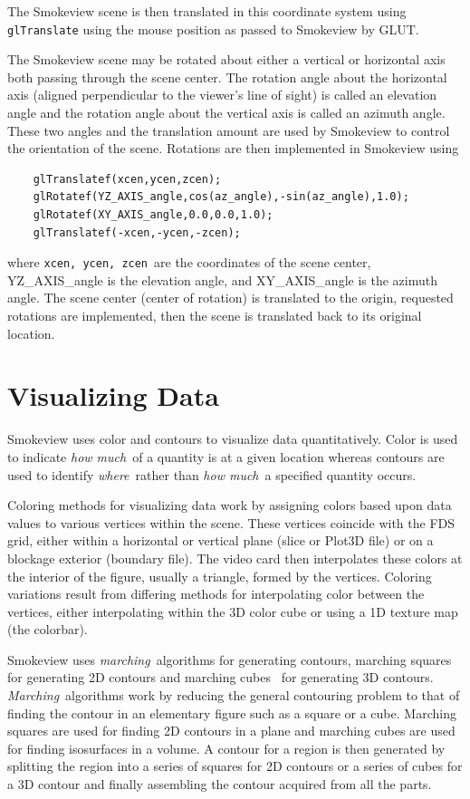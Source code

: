 \documentclass[11pt,twoside]{book}
\begin{document}
The Smokeview scene is then translated in this coordinate system
using {\tt glTranslate} using the mouse position as passed to
Smokeview by GLUT.

The Smokeview scene may be rotated about either a vertical or
horizontal axis both passing through the scene center.  The
rotation angle about the horizontal axis (aligned perpendicular to
the viewer's line of sight) is called an elevation angle and the
rotation angle about the vertical axis is called an azimuth angle.
These two angles and the translation amount are used by Smokeview
to control the orientation of the scene.   Rotations are then
implemented in Smokeview using
\begin{lstlisting}
    glTranslatef(xcen,ycen,zcen);
    glRotatef(YZ_AXIS_angle,cos(az_angle),-sin(az_angle),1.0);
    glRotatef(XY_AXIS_angle,0.0,0.0,1.0);
    glTranslatef(-xcen,-ycen,-zcen);
\end{lstlisting}
where {\tt xcen, ycen, zcen}\ are the coordinates of the scene
center, YZ\_AXIS\_angle is the elevation angle, and
XY\_AXIS\_angle is the azimuth angle.  The scene center (center of
rotation) is translated to the origin, requested rotations are
implemented, then the scene is translated back to its original
location.

%
%

\chapter{Visualizing Data}
Smokeview uses color and contours to visualize data
quantitatively. Color is used to indicate {\em how much}\ of a
quantity is at a given location whereas contours are used to
identify {\em where}\ rather than {\em how much}\ a specified
quantity occurs.

Coloring methods for visualizing data work by assigning colors
based upon data values to various vertices within the scene. These
vertices coincide with the FDS grid, either within a horizontal or
vertical plane (slice or Plot3D file) or on a blockage exterior
(boundary file).  The video card then interpolates these colors at
the interior of the figure, usually a triangle, formed by the
vertices. Coloring variations result from differing methods for
interpolating color between the vertices, either interpolating
within the 3D color cube or using a 1D texture map (the colorbar).

Smokeview uses {\em marching}\ algorithms for generating contours,
marching squares for generating 2D contours and marching
cubes~\cite{marchingcubes} for generating 3D contours. {\em
Marching}\ algorithms work by reducing the general contouring
problem to that of finding the contour in an elementary figure
such as a square or a cube.  Marching squares are used for finding
2D contours in a plane and marching cubes are used for finding
isosurfaces in a volume. A contour for a region is then generated
by splitting the region into a series of squares for 2D contours
or a series of cubes for a 3D contour and finally assembling the
contour acquired from all the parts.
\end{document}
